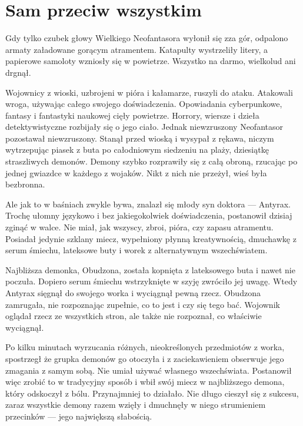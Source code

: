 \chapter{Sam przeciw wszystkim}


Gdy tylko czubek głowy Wielkiego Neofantasora wyłonił się zza gór, odpalono armaty załadowane gorącym atramentem.
Katapulty wystrzeliły litery, a papierowe samoloty wzniosły się w powietrze.
Wszystko na darmo, wielkolud ani drgnął.

Wojownicy z wioski, uzbrojeni w pióra i kałamarze, ruszyli do ataku.
Atakowali wroga, używając całego swojego doświadczenia. Opowiadania cyberpunkowe, fantasy i fantastyki naukowej cięły powietrze.
Horrory, wiersze i dzieła detektywistyczne rozbijały się o jego ciało.
Jednak niewzruszony Neofantasor pozostawał niewzruszony.
Stanął przed wioską i wysypał z rękawa, niczym wytrzepując piasek z buta po całodniowym siedzeniu na plaży, dziesiątkę straszliwych demonów.
Demony szybko rozprawiły się z całą obroną, rzucając po jednej gwiazdce w każdego z wojaków.
Nikt z nich nie przeżył, wieś była bezbronna.

Ale jak to w baśniach zwykle bywa, znalazł się młody syn doktora --- Antyrax.
Trochę ułomny językowo i bez jakiegokolwiek doświadczenia, postanowił dzisiaj zginąć w walce.
Nie miał, jak wszyscy, zbroi, pióra, czy zapasu atramentu.
Posiadał jedynie szklany miecz, wypełniony płynną kreatywnością, dmuchawkę z serum śmiechu, lateksowe buty i worek z alternatywnym wszechświatem.

Najbliższa demonka, Obudzona, została kopnięta z lateksowego buta i nawet nie poczuła.
Dopiero serum śmiechu wstrzyknięte w szyję zwróciło jej uwagę.
Wtedy Antyrax sięgnął do swojego worka i wyciągnął pewną rzecz.
Obudzona zamrugała, nie rozpoznając zupełnie, co to jest i czy się tego bać.
Wojownik oglądał rzecz ze wszystkich stron, ale także nie rozpoznał, co właściwie wyciągnął.

Po kilku minutach wyrzucania różnych, nieokreślonych przedmiotów z worka, spostrzegł że grupka demonów go otoczyła i z zaciekawieniem
obserwuje jego zmagania z samym sobą.
Nie umiał używać własnego wszechświata.
Postanowił więc zrobić to w tradycyjny sposób i wbił swój miecz w najbliższego demona, który odskoczył z bólu. Przynajmniej to działało.
Nie długo cieszył się z sukcesu, zaraz wszystkie demony razem wzięły i dmuchnęły w niego strumieniem przecinków --- jego największą słabością.

